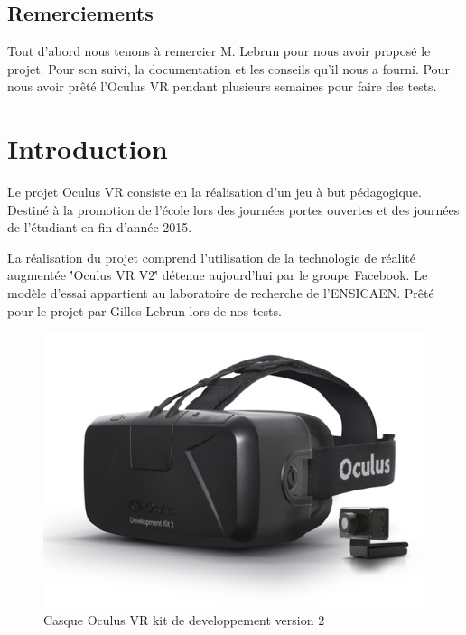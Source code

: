 \documentclass[a4paper,11pt]{myreport}
\begin{document}
\setlength{\textheight}{26cm}
\setlength{\topmargin}{-2cm}

\tableofcontents


\newpage
\section*{Remerciements}
\par Tout d'abord nous tenons à remercier M. Lebrun pour nous avoir proposé le projet. Pour son suivi, la documentation et les conseils qu'il nous a fourni.
Pour nous avoir prêté l'Oculus VR pendant plusieurs semaines pour faire des tests.


\chapter{Introduction}
\par Le projet Oculus VR consiste en la réalisation d'un jeu à but pédagogique. Destiné à la promotion de l'école lors des journées portes ouvertes et des journées de l'étudiant en fin d'année 2015.
\par La réalisation du projet comprend l'utilisation de la technologie de réalité augmentée \''Oculus VR V2\'' détenue aujourd'hui par le groupe Facebook. Le modèle d'essai appartient au laboratoire de recherche de l'ENSICAEN. Prêté pour le projet par Gilles Lebrun lors de nos tests.
\begin{figure}[h] 
	\includegraphics[scale=0.70]{./images/dk2-product.jpg}
	\caption{Casque Oculus VR kit de developpement version 2}
\end{figure}
\end{document}
